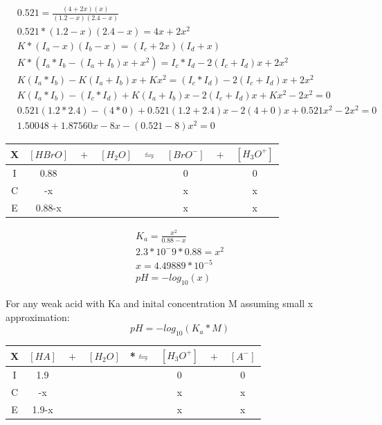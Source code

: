 \documentclass{article}  %
\begin{document}
\begin{equation*}
    \begin{aligned}
        &0.521 = \frac{(4+2x)(x)}{(1.2-x)(2.4-x)} \\
        &0.521 * (1.2-x)(2.4-x) = 4x+ 2x^2 \\ 
        &K * (I_a - x)(I_b - x) = (I_c + 2x)(I_d + x)\\
        &K * (I_a* I_b - (I_a + I_b)x + x^2) = I_c* I_d - 2(I_c + I_d)x + 2x^2 \\
        &K(I_a* I_b) - K(I_a + I_b)x + Kx^2 = (I_c* I_d) - 2(I_c + I_d)x + 2x^2 \\
        &K(I_a* I_b) - (I_c* I_d) + K(I_a + I_b)x - 2(I_c + I_d)x + Kx^2 - 2x^2 = 0 \\
        &0.521(1.2*2.4) - (4*0) + 0.521(1.2 + 2.4)x - 2(4+0)x + 0.521x^2 - 2x^2 = 0 \\
        &1.50048 + 1.87560x - 8x - (0.521-8)x^2 = 0
    \end{aligned}
\end{equation*}

\begin{tabular}{c|c@{}c@{}c@{}c@{}c@{}c@{}c}
    \hline
    X   & $[HBrO]$ & ${}+{}$ & $[H_2O]$ & ${}\leftrightharpoons{}$ & $[BrO^-]$ & ${}+{}$ & $[H_3O^+]$ \\
    \hline
    I   &  0.88    &&     &&  0   && 0  \\
    C   &   -x   &&     &&  x   &&  x \\
    E   &   0.88-x   &&     &&   x  && x  \\      
\end{tabular}

\begin{equation*}
    \begin{aligned}
        K_a = \frac{x^2}{0.88-x} \\
        2.3*10^-9 * 0.88 = x^2 \\
        x = 4.49889*10^{-5} \\
        pH = -log_{10}(x)     
    \end{aligned}
\end{equation*}

For any weak acid with Ka and inital concentration M assuming small x approximation:
\begin{equation}
    pH = - log_{10}(K_a*M)
\end{equation}

\begin{tabular}{c|c@{}c@{}c@{}c@{}c@{}c@{}c}
    \hline
    X   & $[HA]$ & ${}+{}$ & $[H_2O]$ & *${}\leftrightharpoons{}$ & $[H_3O^+]$ & ${}+{}$ & $[A^-]$ \\
    \hline
    I   &  1.9    &&     &&  0   && 0  \\
    C   &   -x   &&     &&  x   &&  x \\
    E   &   1.9-x   &&     &&   x  && x  \\      
\end{tabular}
\end{document}

